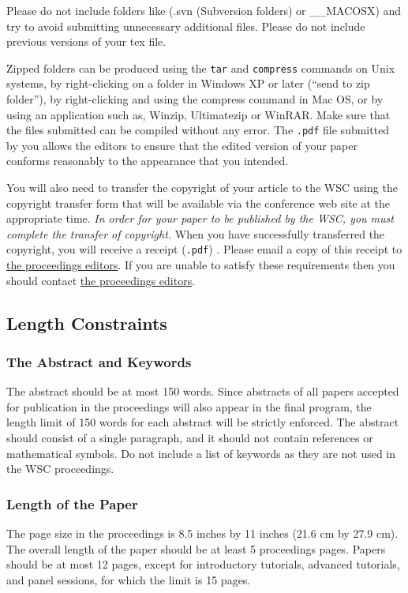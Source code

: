 \documentclass{wscpaperproc}
\theoremstyle{wsc}
\begin{document}
Please do not include folders like (.svn (Subversion folders) or \_\_MACOSX) and try to avoid submitting unnecessary additional files.
Please do not include previous versions of your tex file.

Zipped folders can be
produced using the {\tt tar} and {\tt compress} commands on Unix systems, by right-clicking on
a folder in Windows XP or later (``send to zip folder''), by right-clicking and using the compress command in Mac OS, or by using an application such as,
Winzip, Ultimatezip or WinRAR.
Make sure that the files submitted can be compiled without any error.
The {\tt .pdf} file submitted by you allows the editors to ensure that the edited version of your paper conforms reasonably to the appearance
that you intended.

You will also need to transfer the copyright of your article to the WSC using the copyright transfer form that will be available via the conference web site at the appropriate time. {\em In order for your paper to be published by the WSC, you must complete the transfer of copyright.}
When you have successfully transferred the copyright, you will receive a receipt ({\tt .pdf}) .
Please email a copy of this receipt to \href{mailto://wsc16proceedings@gmail.com}{the proceedings editors}. If you are unable to satisfy these requirements then you should contact \href{mailto://wsc16proceedings@gmail.com}{the proceedings editors}.

\subsection{Length Constraints}

\subsubsection{The Abstract and Keywords}
The abstract should be at most 150 words. Since abstracts of all papers accepted for publication in the proceedings will also appear in the final program, the length limit of 150 words for each abstract will be strictly enforced. The abstract should consist of a single paragraph, and it should not
contain references or mathematical symbols. Do not include a list of keywords as they are not used in the WSC proceedings.

\subsubsection{Length of the Paper}
The page size in the proceedings is 8.5 inches by 11 inches (21.6 cm by 27.9 cm). The overall length of the paper should be at least 5 proceedings pages. Papers should be at most 12 pages, except for introductory tutorials, advanced tutorials, and panel sessions, for which the limit is 15 pages.
\end{document}
